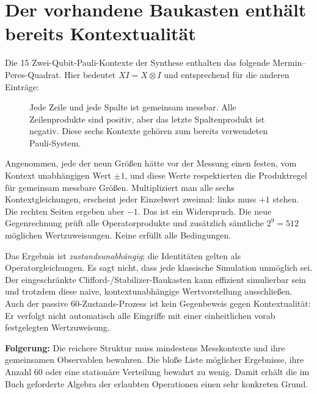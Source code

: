 \section{Der vorhandene Baukasten enthält bereits Kontextualität}
Die 15 Zwei-Qubit-Pauli-Kontexte der Synthese enthalten das folgende Mermin--Peres-Quadrat. Hier bedeutet $XI=X\otimes I$ und entsprechend für die anderen Einträge:
\begin{figure}[H]\centering
{}
\caption{Jede Zeile und jede Spalte ist gemeinsam messbar. Alle Zeilenprodukte sind positiv, aber das letzte Spaltenprodukt ist negativ. Diese sechs Kontexte gehören zum bereits verwendeten Pauli-System.}
\end{figure}

Angenommen, jede der neun Größen hätte vor der Messung einen festen, vom Kontext unabhängigen Wert $\pm1$, und diese Werte respektierten die Produktregel für gemeinsam messbare Größen. Multipliziert man alle sechs Kontextgleichungen, erscheint jeder Einzelwert zweimal: links muss $+1$ stehen. Die rechten Seiten ergeben aber $-1$. Das ist ein Widerspruch. Die neue Gegenrechnung prüft alle Operatorprodukte und zusätzlich sämtliche $2^9=512$ möglichen Wertzuweisungen. Keine erfüllt alle Bedingungen. 

Das Ergebnis ist \emph{zustandsunabhängig}; die Identitäten gelten als Operatorgleichungen. Es sagt nicht, dass jede klassische Simulation unmöglich sei. Der eingeschränkte Clifford-/Stabilizer-Baukasten kann effizient simulierbar sein und trotzdem diese naive, kontextunabhängige Wertvorstellung ausschließen. Auch der passive 60-Zustands-Prozess ist kein Gegenbeweis gegen Kontextualität: Er verfolgt nicht automatisch alle Eingriffe mit einer einheitlichen vorab festgelegten Wertzuweisung.

\textbf{Folgerung:} Die reichere Struktur muss mindestens Messkontexte und ihre gemeinsamen Observablen bewahren. Die bloße Liste möglicher Ergebnisse, ihre Anzahl 60 oder eine stationäre Verteilung bewahrt zu wenig. Damit erhält die im Buch geforderte Algebra der erlaubten Operationen einen sehr konkreten Grund.

